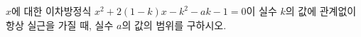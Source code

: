 \hspace*{2mm}\begin{minipage}[t]{\dimexpr\linewidth-2mm\relax}\vspace{0pt}
$x$에 대한 이차방정식 $x^2+2(1-k)x-k^2-ak-1=0$이 실수 $k$의 값에 관계없이 항상 실근을 가질 때, 실수 $a$의 값의 범위를 구하시오.\end{minipage}
